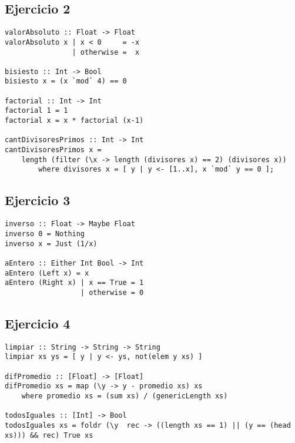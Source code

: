 \documentclass[10pt,a4paper]{article}
\begin{document}
\newpage
\subsection{Ejercicio 2}
\begin{centrado}
\begin{verbatim}
valorAbsoluto :: Float -> Float
valorAbsoluto x | x < 0     = -x
                | otherwise =  x

bisiesto :: Int -> Bool
bisiesto x = (x `mod` 4) == 0

factorial :: Int -> Int
factorial 1 = 1
factorial x = x * factorial (x-1)

cantDivisoresPrimos :: Int -> Int
cantDivisoresPrimos x = 
    length (filter (\x -> length (divisores x) == 2) (divisores x))
        where divisores x = [ y | y <- [1..x], x `mod` y == 0 ];
\end{verbatim}
\end{centrado}

\subsection{Ejercicio 3}
\begin{centrado}
\begin{verbatim}
inverso :: Float -> Maybe Float
inverso 0 = Nothing
inverso x = Just (1/x)

aEntero :: Either Int Bool -> Int
aEntero (Left x) = x
aEntero (Right x) | x == True = 1
                  | otherwise = 0
\end{verbatim}
\end{centrado}

\subsection{Ejercicio 4}
\begin{centrado}
\begin{verbatim}
limpiar :: String -> String -> String
limpiar xs ys = [ y | y <- ys, not(elem y xs) ]

difPromedio :: [Float] -> [Float]
difPromedio xs = map (\y -> y - promedio xs) xs 
    where promedio xs = (sum xs) / (genericLength xs)

todosIguales :: [Int] -> Bool
todosIguales xs = foldr (\y  rec -> ((length xs == 1) || (y == (head xs))) && rec) True xs
\end{verbatim}
\end{centrado}
\end{document}
